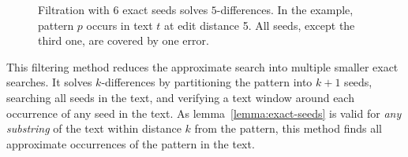 \begin{figure}[h]
\begin{center}
\caption[Filtration with exact seeds]{Filtration with 6 exact seeds solves $5$-differences. In the example, pattern $p$ occurs in text $t$ at edit distance 5. All seeds, except the third one, are covered by one error.}
\label{fig:seeds-ext}

\end{center}
\end{figure}

This filtering method reduces the approximate search into multiple smaller exact searches.
It solves $k$-differences by partitioning the pattern into $k+1$ seeds, searching all seeds in the text, and verifying a text window around each occurrence of any seed in the text.
As lemma~\ref{lemma:exact-seeds} is valid for \emph{any substring} of the text within distance $k$ from the pattern, this method finds all approximate occurrences of the pattern in the text.


